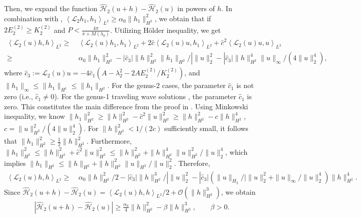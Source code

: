 \documentclass[11pt,reqno]{amsart}
\numberwithin{equation}{section}
\begin{document}
\begin{proof-orbital-cn}
	Then, we expand the function $\mathcal{\hat{H}}_2(u+h)-\mathcal{\hat{H}}_2(u)$ in powers of $h$.
	In combination with , $\left\langle \mathcal{L}_2h_1,h_1 \right\rangle_{L^2} \ge \alpha_0 \|h_1\|_{H^2}^2$, we obtain that if $2 E^{(2)}_2\ge   K^{(2)}_2$ and $P<\frac{4\pi}{\pi+M(\lambda_0)}$. 
	Utilizing H\"{o}lder inequality, we get
	\begin{equation}\nonumber
		\begin{split}
			\left\langle \mathcal{L}_2(u)h,h \right\rangle_{L^2}
			\ge &\ \left\langle \mathcal{L}_2(u)h_1,h_1\right\rangle_{L^2}+2\hat{c}\left\langle \mathcal{L}_2(u)u,h_1\right\rangle_{L^2}+\hat{c}^2\left\langle \mathcal{L}_2(u)u,u\right\rangle_{L^2} \\	
			\ge &\ \alpha_0 \|h_1\|_{H^2}^2-|\hat{c}_3|\|h\|^2_{H^2}\|h_1\|_{H^2}/|\|u\|^2_{2}-|\hat{c}_3|\|h\|^4_{H^2}\|u\|_{\infty}/(4\|u\|^4_{2}),
		\end{split}
	\end{equation}
	where $\hat{c}_3:=\mathcal{L}_2(u)u=-4\hat{c}_1(A-\lambda_2^2-2A E^{(2)}_2/  K^{(2)}_2)$, and $\|h_1\|_{\infty}\le \|h_1\|_{H^1}\le\|h_1\|_{H^2}$.
	For the genus-2 cases, the parameter $\hat{c}_1$ is not zero (i.e., $\hat{c}_1\neq 0$). For the genus-1 traveling wave solutions , the parameter $\hat{c}_1$ is zero. This constitutes the main difference from the proof in \cite{LingS-23-mKdV-stability}. 
	Using Minkowski inequality, we know $\|h_1\|_{H^2}^2\ge \|h\|_{H^2}^2-\hat{c}^2\|u\|_{H^2}^2\ge \|h\|_{H^2}^2-c\|h\|_{H^2}^4$, $c=\|u\|_{H^2}^2/(4\|u\|_{2}^4)$. 
	For $\|h\|_{H^2}^2<1/(2c)$ sufficiently small, it follows that $\|h_1\|_{H^2}^2\ge \frac{1}{2}\|h\|_{H^2}^2$.
	Furthermore, $\|h_1\|_{H^2}^2\le \|h\|_{H^2}^2+\hat{c}^2\|u\|_{H^2}^2\le \|h\|_{H^2}^2+\|h\|_{H^2}^4\|u\|_{H^2}^2/\|u\|_2^4$, which implies $\|h_1\|_{H^2}\le  \|h\|_{H^2}+\|h\|_{H^2}^2\|u\|_{H^2}/\|u\|_2^2$.
	Therefore,
	\begin{equation}\nonumber
		\begin{split}
			\left\langle \mathcal{L}_2(u)h,h \right\rangle_{L^2}
			\ge 	
			&\ \alpha_0 \|h\|_{H^2}^2/2-|\hat{c}_3|\|h\|^3_{H^2}/|\|u\|^2_{2}-|\hat{c}_3|(\|u\|_{H_2}/|\|u\|^2_{2}+\|u\|_{\infty}/\|u\|^4_{2})\|h\|^4_{H^2}.
		\end{split}
	\end{equation}
	Since $\mathcal{\hat{H}}_2(u+h)-\mathcal{\hat{H}}_2(u)= \left\langle \mathcal{L}_2(u)h,h \right\rangle_{L^2}/2 +\mathcal{O}(\|h\|_{H^2}^3)$, 
	we obtain
	\begin{equation}\label{eq:H_2-3}
		\begin{split}
			|\mathcal{\hat{H}}_2(u+h)-\mathcal{\hat{H}}_2(u)|\ge \frac{\alpha_0}{4}\|h\|_{H^2}^2-\beta\|h\|_{H^2}^3, \qquad \beta>0.
		\end{split}
	\end{equation}
		

\end{proof-orbital-cn}
\end{document}
